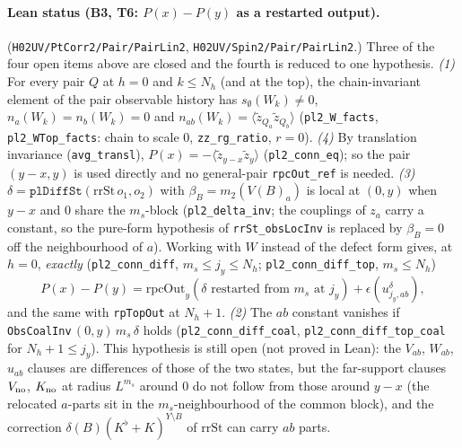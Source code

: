 \documentclass[11pt]{amsart}
\theoremstyle{definition}
\theoremstyle{remark}
\numberwithin{equation}{section}
\begin{document}
\paragraph{Lean status (B3, T6: $P(x)-P(y)$ as a restarted output).}
(\texttt{H02UV/PtCorr2/Pair/PairLin2}, \texttt{H02UV/Spin2/Pair/PairLin2}.) Three of the four open items above are closed and the
fourth is reduced to one hypothesis. \emph{(1)} For every pair $Q$ at $h=0$ and $k\le N_h$ (and at the top), the
chain-invariant element of the pair observable history has $s_\emptyset(W_k)\ne0$, $n_a(W_k)=n_b(W_k)=0$ and
$n_{ab}(W_k)=\langle\tilde z_{Q_a}\tilde z_{Q_b}\rangle$ (\texttt{pl2\_W\_facts}, \texttt{pl2\_WTop\_facts}: chain to
scale $0$, \texttt{zz\_rg\_ratio}, $r=0$). \emph{(4)} By translation invariance (\texttt{avg\_transl}),
$P(x)=-\langle\tilde z_{y-x}\tilde z_y\rangle$ (\texttt{pl2\_conn\_eq}); so the pair $(y-x,y)$ is used directly and no
general-pair \texttt{rpcOut\_ref} is needed. \emph{(3)} $\delta=\texttt{plDiffSt}(\mathrm{rrSt}\,o_1,o_2)$ with
$\beta_B=m_2(V(B)_a)$ is local at $(0,y)$ when $y-x$ and $0$ share the $m_s$-block (\texttt{pl2\_delta\_inv}; the
couplings of $z_a$ carry a constant, so the pure-form hypothesis of \texttt{rrSt\_obsLocInv} is replaced by
$\beta_B=0$ off the neighbourhood of $a$). Working with $W$ instead of the defect form gives, at $h=0$,
\emph{exactly} (\texttt{pl2\_conn\_diff}, $m_s\le j_y\le N_h$; \texttt{pl2\_conn\_diff\_top}, $m_s\le N_h$)
\[
P(x)-P(y)=\mathrm{rpcOut}_y(\delta\text{ restarted from }m_s\text{ at }j_y)+\epsilon(u^{\delta}_{j_y,ab}),
\]
and the same with \texttt{rpTopOut} at $N_h+1$. \emph{(2)} The $ab$ constant vanishes if
\texttt{ObsCoalInv}$\,(0,y)\,m_s\,\delta$ holds (\texttt{pl2\_conn\_diff\_coal}, \texttt{pl2\_conn\_diff\_top\_coal} for
$N_h+1\le j_y$). This hypothesis is still open (not proved in Lean): the $V_{ab}$, $W_{ab}$, $u_{ab}$ clauses are differences
of those of the two states, but the far-support clauses $V_{\rm no}$, $K_{\rm no}$ at radius $L^{m_s}$ around $0$
do not follow from those around $y-x$ (the relocated $a$-parts sit in the $m_s$-neighbourhood of the common
block), and the correction $\delta(B)(K^\flat+K)^{Y\setminus B}$ of $\mathrm{rrSt}$ can carry $ab$ parts.
\end{document}
